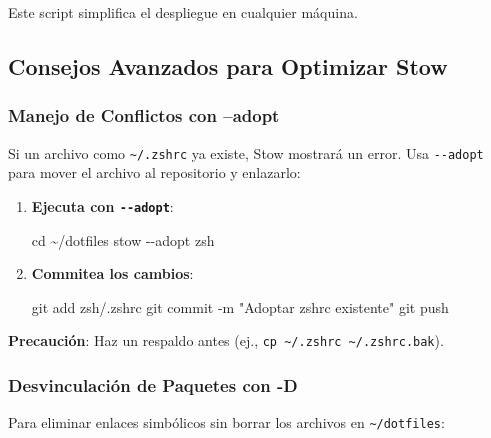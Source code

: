 \documentclass[
  jou,
  floatsintext,
  longtable,
  a4paper,
  nolmodern,
  notxfonts,
  notimes,
  colorlinks=true,linkcolor=blue,citecolor=blue,urlcolor=blue]{apa7}
\newenvironment{Shaded}{\begin{snugshade}}{\end{snugshade}}
\newcommand{\AttributeTok}[1]{\textcolor[rgb]{0.40,0.45,0.13}{#1}}
\newcommand{\BuiltInTok}[1]{\textcolor[rgb]{0.00,0.23,0.31}{#1}}
\newcommand{\ExtensionTok}[1]{\textcolor[rgb]{0.00,0.23,0.31}{#1}}
\newcommand{\FunctionTok}[1]{\textcolor[rgb]{0.28,0.35,0.67}{#1}}
\newcommand{\NormalTok}[1]{\textcolor[rgb]{0.00,0.23,0.31}{#1}}
\newcommand{\StringTok}[1]{\textcolor[rgb]{0.13,0.47,0.30}{#1}}
\begin{document}
Este script simplifica el despliegue en cualquier máquina.

\subsection{Consejos Avanzados para Optimizar
Stow}\label{consejos-avanzados-para-optimizar-stow}

\subsubsection{Manejo de Conflictos con
--adopt}\label{manejo-de-conflictos-con-adopt}

Si un archivo como \texttt{\textasciitilde{}/.zshrc} ya existe, Stow
mostrará un error. Usa \texttt{-\/-adopt} para mover el archivo al
repositorio y enlazarlo:

\begin{enumerate}
\def\labelenumi{\arabic{enumi}.}
\item
  \textbf{Ejecuta con \texttt{-\/-adopt}}:

\begin{Shaded}
\begin{Highlighting}[]
\BuiltInTok{cd}\NormalTok{ \textasciitilde{}/dotfiles}
\ExtensionTok{stow} \AttributeTok{{-}{-}adopt}\NormalTok{ zsh}
\end{Highlighting}
\end{Shaded}
\item
  \textbf{Commitea los cambios}:

\begin{Shaded}
\begin{Highlighting}[]
\FunctionTok{git}\NormalTok{ add zsh/.zshrc}
\FunctionTok{git}\NormalTok{ commit }\AttributeTok{{-}m} \StringTok{"Adoptar zshrc existente"}
\FunctionTok{git}\NormalTok{ push}
\end{Highlighting}
\end{Shaded}
\end{enumerate}

\textbf{Precaución}: Haz un respaldo antes (ej.,
\texttt{cp\ \textasciitilde{}/.zshrc\ \textasciitilde{}/.zshrc.bak}).

\subsubsection{Desvinculación de Paquetes con
-D}\label{desvinculaciuxf3n-de-paquetes-con--d}

Para eliminar enlaces simbólicos sin borrar los archivos en
\texttt{\textasciitilde{}/dotfiles}:
\end{document}
